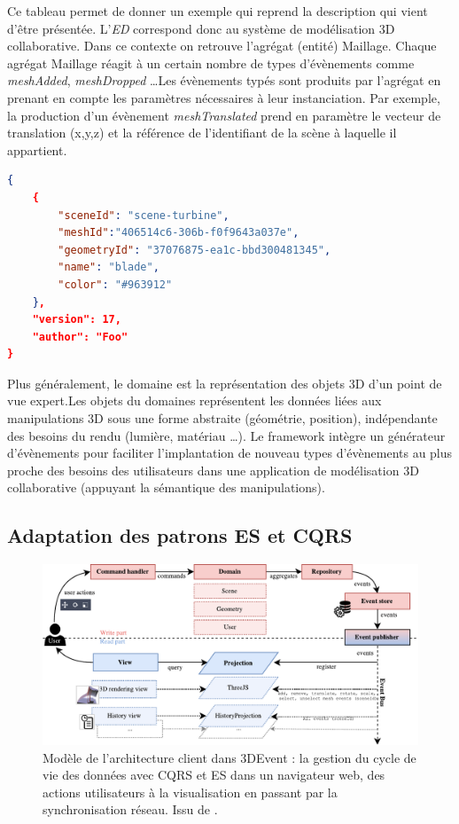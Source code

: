 Ce tableau permet de donner un exemple qui reprend la description qui vient d'être 
présentée. L'\textit{ED} correspond donc au \og système de modélisation 3D 
collaborative\fg{}. 
Dans ce contexte on retrouve l'agrégat (entité) \og Maillage\fg{}. Chaque agrégat 
Maillage 
réagit à un certain nombre de types d'évènements comme \textit{meshAdded}, 
\textit{meshDropped} \dots Les évènements typés sont produits par l'agrégat en 
prenant en compte les paramètres nécessaires à leur instanciation. Par exemple, 
la production d'un évènement \textit{meshTranslated} prend en paramètre le 
vecteur de translation (x,y,z) et la référence de l'identifiant de la scène à laquelle il 
appartient.
\begin{lstlisting}[language=json,firstnumber=1,label=jsonexemple,caption=Mesh 
added to Scene event and parameters]
{
	{
		"sceneId": "scene-turbine",
		"meshId":"406514c6-306b-f0f9643a037e",
		"geometryId": "37076875-ea1c-bbd300481345",
		"name": "blade",
		"color": "#963912"
	},
	"version": 17,
	"author": "Foo"
}
\end{lstlisting}


Plus généralement, le domaine est la représentation des objets 3D d'un point de 
vue expert.Les objets du domaines représentent les données liées aux 
manipulations 3D sous une forme abstraite (géométrie, position), indépendante 
des besoins du rendu (lumière, matériau \dots). Le framework intègre un 
générateur d'évènements pour faciliter l'implantation de nouveau types 
d'évènements au plus proche des besoins des utilisateurs dans une application de 
modélisation 3D collaborative (appuyant la sémantique des manipulations).





\subsection{Adaptation des patrons \gls{ES} et \gls{CQRS}}

\begin{figure}[ht]
	\centering
	\includegraphics[width=0.9\columnwidth]{eps/cqrs2.pdf}
	\caption[Modèle de l'architecture client dans 3DEvent]{Modèle de l'architecture 
		client dans 3DEvent : la gestion du cycle de vie des données avec 
		\gls{CQRS} 
		et \gls{ES} dans un navigateur web, des actions utilisateurs à la visualisation 
		en passant par la synchronisation réseau. Issu de \cite{Desprat2017}.}
	\label{fig:cqrs-client}
\end{figure}

